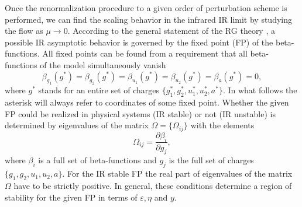 \documentclass[aps,pre,url,twocolumn,superscriptaddress]{revtex4-1}
\def\eps{\varepsilon}
\begin{document}
Once the renormalization procedure to a given order of perturbation
scheme is performed, we can find the scaling 
behavior in the infrared IR limit by studying the flow as $\mu\rightarrow 0$.
According to the general statement of the RG theory \cite{Amit,Vasiliev}, a
possible IR asymptotic behavior is 
governed by the fixed point (FP) of the beta-functions. 
All fixed points 
can be found from a requirement that all beta-functions of the model simultaneously vanish
\begin{equation}
  \beta_{g_1} (g^{*}) =\beta_{g_2} (g^{*})= \beta_{u_1}
  (g^{*})=\beta_{u_2} (g^{*})=\beta_{a} (g^{*})=0,
  \label{eq:gen_beta}
\end{equation}
where $g^{*}$ stands for an entire set of charges $\{g_1^{*},g_2^{*},u_1^{*},u_2^{*},a^{*}\}$.
In what follows the asterisk will always refer to coordinates of
some fixed point.
Whether the given FP could be realized in physical systems (IR stable) or not 
(IR unstable)
is determined by eigenvalues of the matrix $\Omega=\{\Omega_{ij}\}$ with
the elements
\begin{equation}
   \Omega_{ij} = \frac{\partial \beta_i}{\partial g_j},
   \label{eq:matrix}
\end{equation}
where $\beta_i$ is a full set of beta-functions and $g_j$ is 
the full set of charges $\{ g_1 ,g_2 ,u_1 ,u_2 ,a \}$.
For the IR stable FP the real part of eigenvalues of the matrix $\Omega$ have to be
strictly positive. In general, these conditions determine a region of stability for
the given FP in terms of $\eps,\eta$ and $y$.    
%
%
%
%
\end{document}
